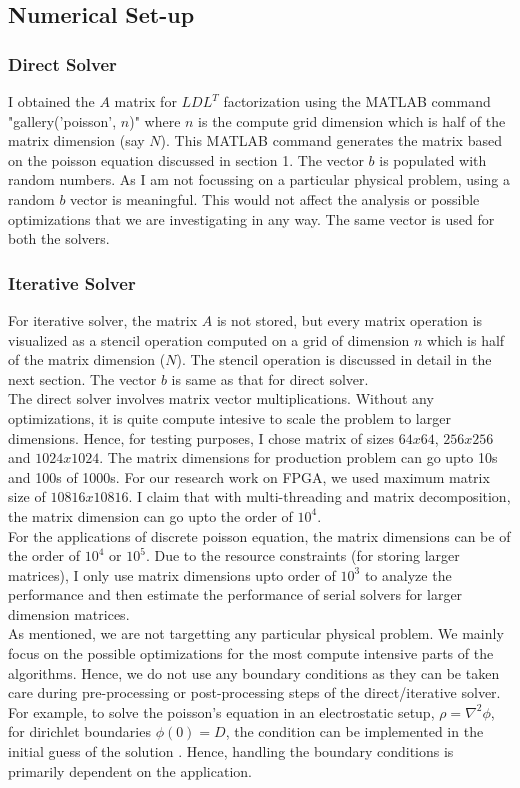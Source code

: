 \documentclass{article}
\begin{document}
\begin{spacing}{1.1}
\subsection{Numerical Set-up}

\subsubsection{Direct Solver}
	I obtained the $A$ matrix for $LDL^T$ factorization using the MATLAB command "gallery('poisson', $n$)" where $n$ is the compute grid dimension which is half of the matrix dimension (say $N$). This MATLAB command generates the matrix based on the poisson equation discussed in section 1. The vector $b$ is populated with random numbers. As I am not focussing on a particular physical problem, using a random $b$ vector is meaningful. This would not affect the analysis or possible optimizations that we are investigating in any way. The same vector is used for both the solvers.

\subsubsection{Iterative Solver}
	For iterative solver, the matrix $A$ is not stored, but every matrix operation is visualized as a stencil operation computed on a grid of dimension $n$ which is half of the matrix dimension ($N$). The stencil operation is discussed in detail in the next section. The vector $b$ is same as that for direct solver.
\\
\newline
 The direct solver involves matrix vector multiplications. Without any optimizations, it is quite compute intesive to scale the problem to larger dimensions. Hence, for testing purposes, I chose matrix of sizes $64x64$, $256x256$ and $1024x1024$. The matrix dimensions for production problem can go upto 10s and 100s of 1000s. For our research work on FPGA, we used maximum matrix size of $10816x10816$. I claim that with multi-threading and matrix decomposition, the matrix dimension can go upto the order of $10^4$.
 \\
 For the applications of discrete poisson equation, the matrix dimensions can be of the order of $10^4$ or $10^5$. Due to the resource constraints (for storing larger matrices), I only use matrix dimensions upto order of $10^3$ to analyze the performance and then estimate the performance of serial solvers for larger dimension matrices.
\\
As mentioned, we are not targetting any particular physical problem. We mainly focus on the possible optimizations for the most compute intensive parts of the algorithms. Hence, we do not use any boundary conditions as they can be taken care during pre-processing or post-processing steps of the direct/iterative solver. For example, to solve the poisson's equation in an electrostatic setup, 
$\rho = \nabla^2\phi$,
for dirichlet boundaries $\phi(0) = D$, the condition can be implemented in the initial guess of the solution \cite{stackexchangeBoundary}. Hence, handling the boundary conditions is primarily dependent on the application.

\end{spacing}
\end{document}
